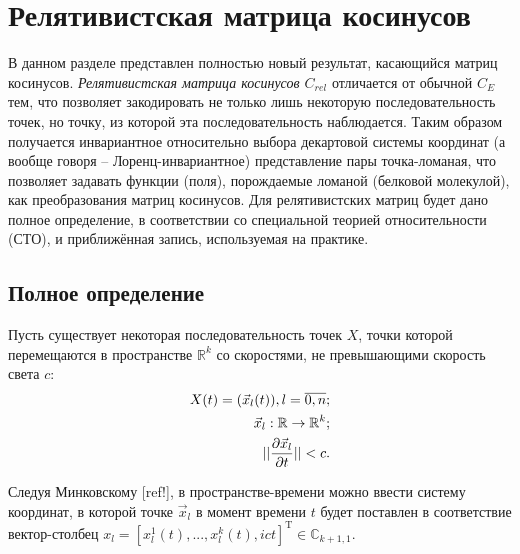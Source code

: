 

\section{Релятивистская матрица косинусов}

В данном разделе представлен полностью новый результат, касающийся матриц косинусов. \textit{Релятивистская матрица косинусов $C_{rel}$} отличается от обычной $C_E$ тем, что позволяет закодировать не только лишь некоторую последовательность точек, но точку, из которой эта последовательность наблюдается. Таким образом получается инвариантное относительно выбора декартовой системы координат (а вообще говоря -- Лоренц-инвариантное) представление пары точка-ломаная, что позволяет задавать функции (поля), порождаемые ломаной (белковой молекулой), как преобразования матриц косинусов. Для релятивистских матриц будет дано полное определение, в соответствии со специальной теорией относительности (СТО), и приближённая запись, используемая на практике.

\subsection{Полное определение}

Пусть существует некоторая последовательность точек $X$, точки которой перемещаются в пространстве $\mathbb{R}^{k}$ со скоростями, не превышающими скорость света $c$:
\begin{align}
	X(t) = (\vec{x}_{l}(t)), l = \overline{0,n}; \\
	\vec{x}_l : \mathbb{R} \rightarrow \mathbb{R}^{k}; \notag \\
	||\frac{\partial{\vec{x}_l}}{\partial{t}}|| < c. \notag
\end{align}

Следуя Минковскому [ref!], в пространстве-времени можно ввести систему координат, в которой точке $\vec{x}_l$ в момент времени $t$ будет поставлен в соответствие вектор-столбец $x_l = [x^1_l(t), ..., x^k_l(t), ict]^\mathrm{T} \in \mathbb{C}_{k+1,1}$.

